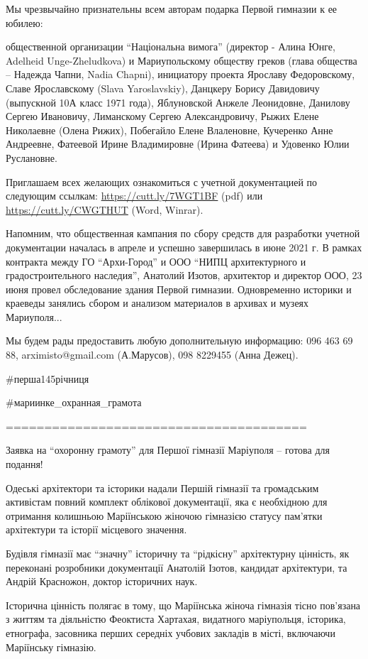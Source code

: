 Мы чрезвычайно признательны всем авторам подарка Первой гимназии к ее юбилею: 

общественной организации \enquote{Національна вимога} (директор - Алина Юнге, Adelheid
Unge-Zheludkova) и Мариупольскому обществу греков (глава общества – Надежда
Чапни, Nadia Chapni), инициатору проекта Ярославу Федоровскому, Славе
Ярославскому (Slava Yaroslavskiy), Данцкеру Борису Давидовичу (выпускной 10А
класс 1971 года), Яблуновской Анжеле Леонидовне, Данилову Сергею Ивановичу,
Лиманскому Сергею Александровичу, Рыжих Елене Николаевне (Олена Рижих),
Побегайло Елене Влаленовне, Кучеренко Анне Андреевне, Фатеевой Ирине
Владимировне (Ирина Фатеева) и Удовенко Юлии Руслановне. 

Приглашаем всех желающих ознакомиться с учетной документацией по следующим
ссылкам: \url{https://cutt.ly/7WGT1BF} (pdf) или \url{https://cutt.ly/CWGTHUT} (Word,
Winrar).

Напомним, что общественная кампания по сбору средств для разработки учетной
документации началась в апреле и успешно завершилась в июне 2021 г. В рамках
контракта между ГО \enquote{Архи-Город} и ООО \enquote{НИПЦ архитектурного и градостроительного
наследия}, Анатолий Изотов, архитектор и директор ООО, 23 июня провел
обследование здания Первой гимназии. Одновременно историки и краеведы занялись
сбором и анализом материалов в архивах и музеях Мариуполя... 

Мы будем рады предоставить любую дополнительную информацию: 096 463 69 88,
arximisto@gmail.com (А.Марусов), 098 8229455 (Анна Дежец).

\#перша145річниця

\#мариинке\_охранная\_грамота

=======================================

Заявка на \enquote{охоронну грамоту} для Першої гімназії Маріуполя – готова для подання! 

Одеські архітектори та історики надали Першій гімназії та громадським
активістам повний комплект облікової документації, яка є необхідною для
отримання колишньою Маріїнською жіночою гімназією статусу пам'ятки архітектури
та історії місцевого значення. 

Будівля гімназії має \enquote{значну} історичну та \enquote{рідкісну} архітектурну цінність, як
переконані розробники документації Анатолій Ізотов, кандидат архітектури, та
Андрій Красножон, доктор історичних наук. 

Історична цінність полягає в тому, що Маріїнська жіноча гімназія тісно
пов'язана з життям та діяльністю Феоктиста Хартахая, видатного маріупольця,
історика, етнографа, засовника перших середніх учбових закладів в місті,
включаючи Маріїнську гімназію.

